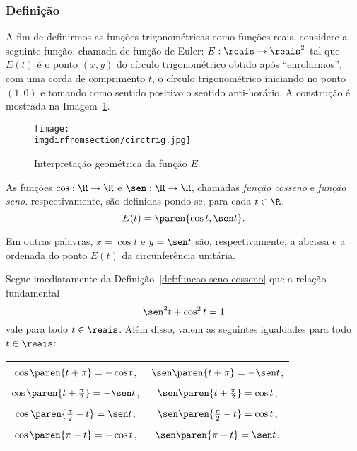 \subsubsection{Definição}

A fim de definirmos as funções trigonométricas como funções
reais, considere a seguinte função, chamada de função de Euler: $E:
\reais \to \reais^2$ tal que $E(t)$ é o ponto $(x, y)$ do círculo
trigonométrico obtido após ``enrolarmos'', com uma corda de comprimento
$t$, o círculo trigonométrico iniciando no ponto $(1, 0)$ e tomando
como sentido positivo o sentido anti-horário. 
A construção é mostrada na Imagem~\ref{fig:ciclo-trigonometrico}.

\begin{figure}[H]
\centering
\texttt{[image: \\imgdirfromsection/circtrig.jpg]}
\caption{Interpretação geométrica da função $E$.}
\label{fig:ciclo-trigonometrico}
\end{figure}

\begin{definition}
\label{def:funcao-seno-cosseno}
    As funções $\cos : \R \to \R$ e $\sen : \R \to \R$, chamadas
\emph{função cosseno} e \emph{função seno}. respectivamente, são
definidas pondo-se, para cada $t \in \R$,
$$E(t) = \paren{\cos t , \sen t}.$$

Em outras palavras, $x= \cos t$ e $y = \sen t$ são, respectivamente,
a abcissa e a ordenada do ponto $E(t)$ da circunferência unitária.
\end{definition}

Segue imediatamente da Definição~\ref{def:funcao-seno-cosseno} que a
relação fundamental $$ \sen^2 t + \cos^2 t = 1$$ vale para todo $t
\in \reais$.
Além disso, valem as seguintes igualdades para todo $t \in \reais$:
\begin{center}
\begin{tabular}{ c c }
    $\cos \paren{t+ \pi} = -\cos t$, & $\sen \paren{t+ \pi} = -\sen t$, \\
    $\cos \paren{t+ \frac {\pi} 2} = -\sen t$, & $\sen \paren{t+ \frac {\pi} 2} = \cos t$, \\
    $\cos \paren{ \frac {\pi} 2 -t} = \sen t$, & $\sen \paren{ \frac {\pi} 2 -t} = \cos t$, \\
    $\cos \paren{ \pi -t} = -\cos t$, & $\sen \paren{ \pi -t} = \sen t$. \\
  \end{tabular}
\end{center}

